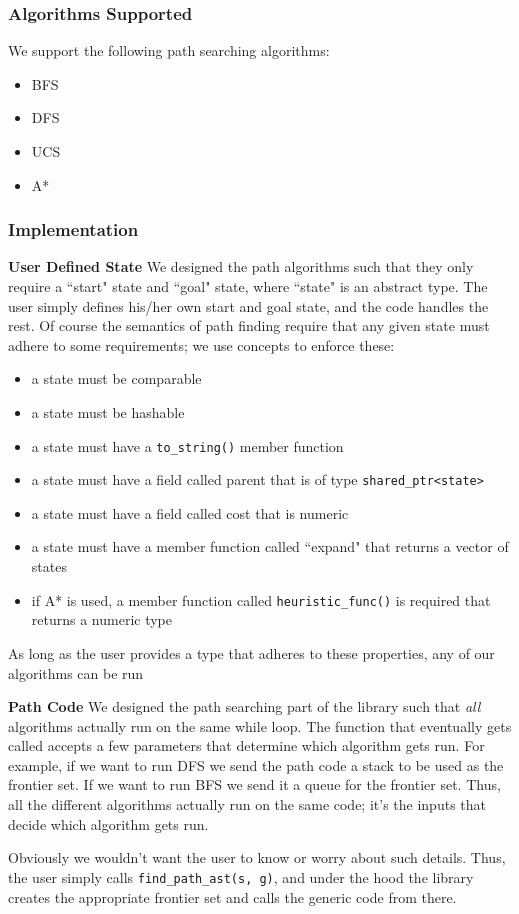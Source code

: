 \documentclass{article}
\begin{document}
\subsubsection{Algorithms Supported}
We support the following path searching algorithms: 
\begin{itemize}
\item BFS
\item DFS
\item UCS
\item A*
\end{itemize}

\subsubsection{Implementation}
\textbf{User Defined State}
We designed the path algorithms such that they only require a ``start" state and ``goal" state, where ``state" is an abstract type. The user simply defines his/her own start and goal state, and the code handles the rest. Of course the semantics of path finding require that any given state must adhere to some requirements; we use concepts to enforce these:
\begin{itemize}
\item a state must be comparable
\item a state must be hashable
\item a state must have a \texttt{to\_string()} member function
\item a state must have a field called parent that is of type \texttt{shared\_ptr<state>}
\item a state must have a field called cost that is numeric
\item a state must have a member function called ``expand" that returns a vector of states
\item if A* is used, a member function called \texttt{heuristic\_func()} is required that returns a numeric type
\end{itemize}
As long as the user provides a type that adheres to these properties, any of our algorithms can be run

\textbf{Path Code}
We designed the path searching part of the library such that \emph{all} algorithms actually run on the same while loop. The function that eventually gets called accepts a few parameters that determine which algorithm gets run. For example, if we want to run DFS we send the path code a stack to be used as the frontier set. If we want to run BFS we send it a queue for the frontier set. Thus, all the different algorithms actually run on the same code; it's the inputs that decide which algorithm gets run. 
\par
Obviously we wouldn't want the user to know or worry about such details. Thus, the user simply calls \texttt{find\_path\_ast(s, g)}, and under the hood the library creates the appropriate frontier set and calls the generic code from there.
\end{document}
